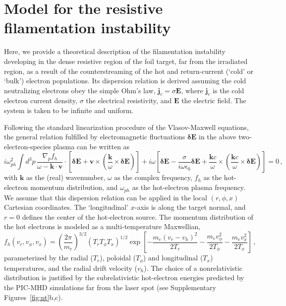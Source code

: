 \documentclass[aps,superscriptaddress]{revtex4}
\begin{document}
\section{Model for the resistive filamentation instability} \label{sec:dispe_res}

Here, we provide a theoretical description of the filamentation instability developing in the dense resistive region of the foil target, far from the irradiated region, as a result of the counterstreaming of the hot and return-current (`cold' or `bulk') electron populations. Its dispersion relation is derived assuming the cold neutralizing electrons obey the simple Ohm's law, $\mathbf{j}_c =\sigma \mathbf{E}$, where $\mathbf{j}_c$ is the cold electron current density, $\sigma$ the electrical resistivity, and $\mathbf{E}$ the electric field. The system is taken to be infinite and uniform.

Following the standard linearization procedure of the Vlasov-Maxwell equations, the general relation fulfilled by electromagnetic fluctuations $\boldsymbol{\delta E}$ in the above two-electron-species plasma can be written as
\begin{equation}\label{eq:rose}
i \omega_{ph}^2 \int d^3 p\,\frac{\nabla_p f_h}{\omega -\mathbf{k}\cdot\mathbf{v}}\cdot \left[ \boldsymbol{\delta E} +\mathbf{v}\times\left( \frac{\mathbf{k}}{\omega} \times \boldsymbol{\delta E}\right)\right]
+ i\omega \left[ \boldsymbol{\delta E}- \frac{\sigma }{i\omega \epsilon_0}\boldsymbol{\delta E}+ \frac{\mathbf{k}c}{\omega}\times \left(\frac{\mathbf{k}c}{\omega} \times \boldsymbol{\delta E} \right) \right] =0 \,,
\end{equation}
with $\mathbf{k}$ as the (real) wavenumber, $\omega$ as the complex frequency, $f_h$ as the hot-electron momentum distribution, and $\omega_{ph}$ as the hot-electron plasma frequency.
We assume that this dispersion relation can be applied in the local $(r,\phi,x)$ Cartesian coordinates. The `longitudinal' $x$-axis is along the target normal, and $r=0$ defines the center of the hot-electron source.
The momentum distribution of the hot electrons is modeled as a multi-temperature Maxwellian,
\begin{equation}\label{eq:distrib}
f_h(v_r, v_\phi, v_x) = \left(\frac{2\pi }{m_e}\right)^{3/2} \left( T_r T_\phi T_x \right)^{1/2} \exp \left[-\frac{m_e(v_r-v_h)^2}{2T_r} -\frac{m_ev_\phi^2}{2T_\phi} -\frac{m_ev_x^2}{2T_x} \right]\,,
\end{equation}
parameterized by the radial ($T_r$), poloidal ($T_\phi$) and longitudinal ($T_x$) temperatures, and the radial drift velocity ($v_h$). The choice of a nonrelativistic distribution is justified by the subrelativistic hot-electron energies predicted by the PIC-MHD simulations far from the laser spot (see Supplementary Figures~\ref{fig:nt}b,c).
\end{document}
